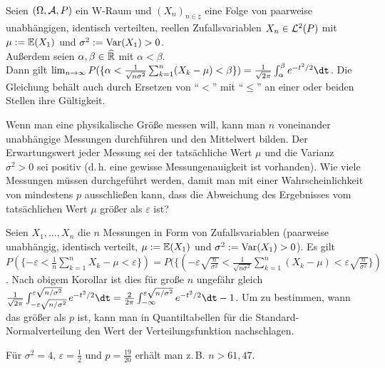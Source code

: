 \begin{Kor}\\
    Seien $(\Omega, \mathcal{A}, P)$ ein W-Raum und $(X_n)_{n \in \natural}$
    eine Folge von paarweise unabhängigen, identisch verteilten,
    reellen Zufallsvariablen $X_n \in \mathcal{L}^2(P)$ mit $\mu := \mathbb{E}(X_1)$ und
    $\sigma^2 := \text{Var}(X_1) > 0$.\\
    Außerdem seien $\alpha, \beta \in \widehat{\mathbb{R}}$ mit $\alpha < \beta$.\\
    Dann gilt $\lim_{n \to \infty}
    P(\{\alpha < \frac{1}{\sqrt{n\sigma^2}} \sum_{k=1}^n (X_k - \mu) < \beta\}) =
    \frac{1}{\sqrt{2\pi}} \int_\alpha^\beta e^{-t^2/2} \dt$.
    Die Gleichung behält auch durch Ersetzen von "`$<$"' mit "`$\le$"' an einer oder beiden
    Stellen ihre Gültigkeit.
\end{Kor}

\linie

\begin{Bsp}
    Wenn man eine physikalische Größe messen will,
    kann man $n$ voneinander unabhängige Messungen durchführen und den Mittelwert bilden.
    Der Erwartungswert jeder Messung sei der tatsächliche Wert $\mu$ und
    die Varianz $\sigma^2 > 0$ sei positiv (d.\,h. eine gewisse Messungenauigkeit ist vorhanden).
    Wie viele Messungen müssen durchgeführt werden, damit man mit einer Wahrscheinlichkeit von
    mindestens $p$ ausschließen kann, dass die Abweichung des Ergebnisses vom tatsächlichen
    Wert $\mu$ größer als $\varepsilon$ ist?

    Seien $X_1, \dotsc, X_n$ die $n$ Messungen in Form von Zufallsvariablen
    (paarweise unabhängig, identisch verteilt, $\mu := \mathbb{E}(X_1)$ und $\sigma^2 := \text{Var}(X_1) > 0$).
    Es gilt $P(\{-\varepsilon < \frac{1}{n} \sum_{k=1}^n X_k - \mu < \varepsilon\}) =
    P(\{(-\varepsilon\sqrt{\frac{n}{\sigma^2}} <
    \frac{1}{\sqrt{n\sigma^2}} \sum_{k=1}^n (X_k - \mu) <
    \varepsilon\sqrt{\frac{n}{\sigma^2}}\})$.
    Nach obigem Korollar ist dies für große $n$ ungefähr gleich
    $\frac{1}{\sqrt{2\pi}} \int_{-\varepsilon\sqrt{n/\sigma^2}}^{\varepsilon\sqrt{n/\sigma^2}}
    e^{-t^2/2} \dt = \frac{2}{2\pi}
    \int_{-\infty}^{\varepsilon\sqrt{n/\sigma^2}} e^{-t^2/2} \dt - 1$.
    Um zu bestimmen, wann das größer als $p$ ist, kann man in Quantiltabellen für die
    Standard-Normalverteilung den Wert der Verteilungsfunktion nachschlagen.

    Für $\sigma^2 = 4$, $\varepsilon = \frac{1}{2}$ und $p = \frac{19}{20}$ erhält man z.\,B.
    $n > 61{,}47$.
\end{Bsp}

